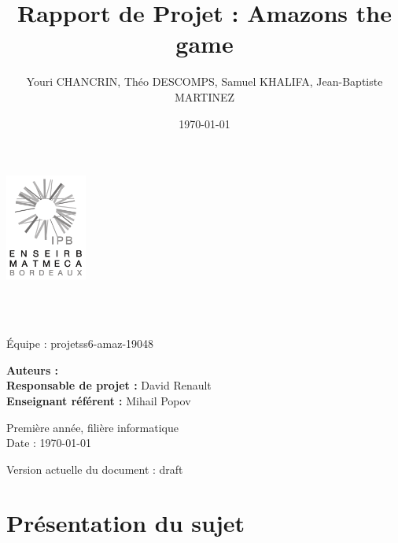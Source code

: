 \documentclass{article}
\title{Rapport de Projet : Amazons the game}
\author{Youri CHANCRIN, Théo DESCOMPS, Samuel KHALIFA, Jean-Baptiste MARTINEZ}
\date{\today}
\makeatletter
\let\mytitle\@title
\let\myauthor\@author
\makeatother
\begin{document}
\begin{flushleft}

\thispagestyle{empty}
\includegraphics[width=0.2\textwidth]{enseirb-matmeca}
\graphicspath{{./img/}}


\hrulefill \\[2em]
\begin{center}
\textbf{\Huge \mytitle}\\[0.8em]
{\large Équipe : projetss6-amaz-19048}
\\[0.8em]
\end{center}
\hrulefill


{\large \textbf{Auteurs :} \myauthor}\\
{\large \textbf{Responsable de projet :} David Renault}\\
{\large \textbf{Enseignant référent :} Mihail Popov}


\begin{center}
  Première année, filière informatique\\
  Date : \today
\end{center}


\hfill Version actuelle du document : draft

\end{flushleft}

\newpage

\tableofcontents

\newpage

\section{Présentation du sujet}

\end{document}
